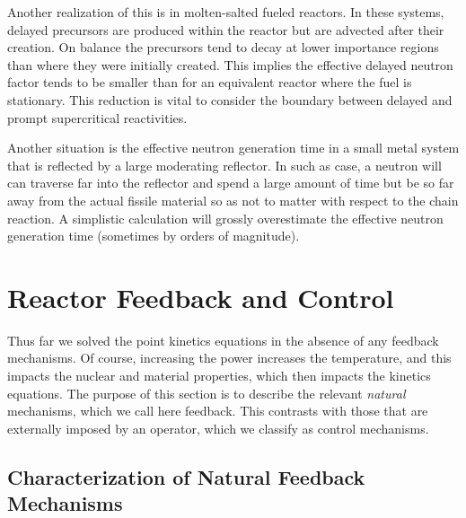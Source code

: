 Another realization of this is in molten-salted fueled reactors. In these systems, delayed precursors are produced within the reactor but are advected after their creation. On balance the precursors tend to decay at lower importance regions than where they were initially created. This implies the effective delayed neutron factor tends to be smaller than for an equivalent reactor where the fuel is stationary. This reduction is vital to consider the boundary between delayed and prompt supercritical reactivities.

Another situation is the effective neutron generation time in a small metal system that is reflected by a large moderating reflector. In such as case, a neutron will can traverse far into the reflector and spend a large amount of time but be so far away from the actual fissile material so as not to matter with respect to the chain reaction. A simplistic calculation will grossly overestimate the effective neutron generation time (sometimes by orders of magnitude).



\section{Reactor Feedback and Control}

Thus far we solved the point kinetics equations in the absence of any feedback mechanisms. Of course, increasing the power increases the temperature, and this impacts the nuclear and material properties, which then impacts the kinetics equations. The purpose of this section is to describe the relevant \emph{natural} mechanisms, which we call here feedback. This contrasts with those that are externally imposed by an operator, which we classify as control mechanisms.

\subsection{Characterization of Natural Feedback Mechanisms}

